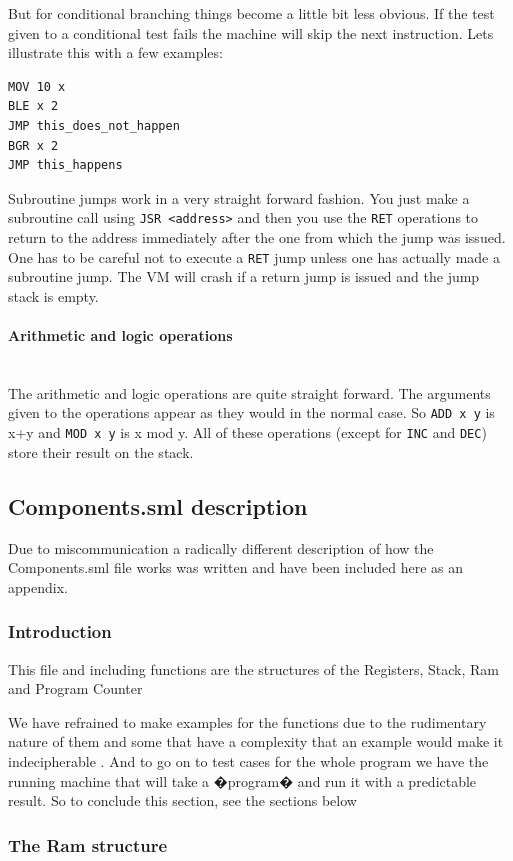 \documentclass{article}
\newcommand{\V}{\verb}
\begin{document}
But for conditional branching things become a little bit less obvious. If the
test given to a conditional test fails the machine will skip the next
instruction. Lets illustrate this with a few examples:
\begin{verbatim}
MOV 10 x
BLE x 2
JMP this_does_not_happen
BGR x 2
JMP this_happens
\end{verbatim}

Subroutine jumps work in a very straight forward fashion. You just make a
subroutine call using \V+JSR <address>+ and then you use the \V+RET+ operations
to return to the address immediately after the one from which the jump was
issued. One has to be careful not to execute a \V+RET+ jump unless one has
actually made a subroutine jump. The VM will crash if a return jump is issued
and the jump stack is empty.

\paragraph{Arithmetic and logic operations} \
\\
The arithmetic and logic operations are quite straight forward. The arguments
given to the operations appear as they would in the normal case. So \V+ADD x y+
is x+y and \V+MOD x y+ is x mod y. All of these operations (except for \V+INC+
and \V+DEC+) store their result on the stack.

\subsection{Components.sml description}
Due to miscommunication a radically different description of how the
Components.sml file works was written and have been included here as an
appendix.
\subsubsection{Introduction}

This file and including functions are the structures of the Registers, Stack, Ram and Program Counter

We have refrained to make examples for the functions due to the rudimentary nature of them and some that have a complexity that an example would make it indecipherable . And to go on to test cases for the whole program we have the running machine that will take a �program� and run it with a predictable result. So to conclude this section,  see the sections below 


\subsubsection{The Ram structure}
\end{document}
